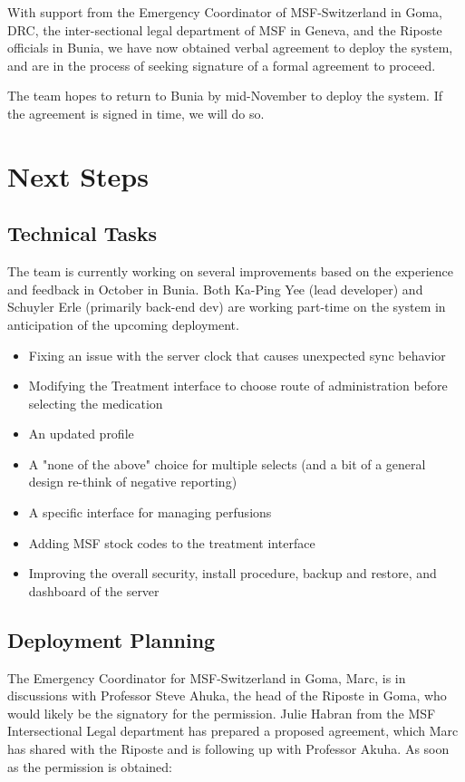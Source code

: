 \documentclass[a4paper,12pt,twoside]{article}
\begin{document}
With support from the Emergency Coordinator of MSF-Switzerland in Goma, DRC, the inter-sectional legal department of MSF in Geneva, and the Riposte officials in Bunia, we have now obtained verbal agreement to deploy the system, and are in the process of seeking signature of a formal agreement to proceed. 

The team hopes to return to Bunia by mid-November to deploy the system. If the agreement is signed in time, we will do so.

\section{Next Steps}
\subsection{Technical Tasks}
The team is currently working on several improvements based on the experience and feedback in October in Bunia. Both Ka-Ping Yee (lead developer) and Schuyler Erle (primarily back-end dev) are working part-time on the system in anticipation of the upcoming deployment. 
\begin{itemize}
    \item Fixing an issue with the server clock that causes unexpected sync behavior
    \item Modifying the Treatment interface to choose route of administration before selecting the medication
    \item An updated profile
    \item A "none of the above" choice for multiple selects (and a bit of a general design re-think of negative reporting)
    \item A specific interface for managing perfusions
    \item Adding MSF stock codes to the treatment interface
    \item Improving the overall security, install procedure, backup and restore, and dashboard of the server
\end{itemize}

\subsection{Deployment Planning}
The Emergency Coordinator for MSF-Switzerland in Goma, Marc, is in discussions with Professor Steve Ahuka, the head of the Riposte in Goma, who would likely be the signatory for the permission. Julie Habran from the MSF Intersectional Legal department has prepared a proposed agreement, which Marc has shared with the Riposte and is following up with Professor Akuha. As soon as the permission is obtained:
\end{document}
